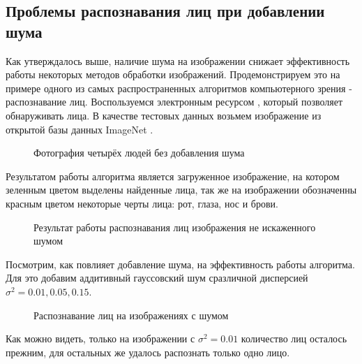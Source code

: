 \subsection{Проблемы распознавания лиц при добавлении шума}
Как утверждалось выше, наличие шума на изображении снижает эффективность работы некоторых методов обработки изображений. Продемонстрируем это на примере одного из самых распространенных алгоритмов компьютерного зрения - распознавание лиц.
Воспользуемся электронным ресурсом \cite{FaceDetections}, который позволяет обнаруживать лица. В качестве тестовых данных возьмем изображение из открытой базы данных ImageNet \cite{imageNet}.
\begin{figure}[H]
	\caption{Фотография четырёх людей без добавления  шума}
\end{figure}
Результатом работы алгоритма является загруженное изображение, на котором зеленным цветом выделены найденные лица, так же на изображении обозначенны красным цветом некоторые черты лица: рот, глаза, нос и брови.
\begin{figure}[H]
	\caption{Результат работы распознавания лиц изображения не искаженного шумом}
\end{figure}
Посмотрим, как повлияет добавление шума, на эффективность работы алгоритма. Для это добавим аддитивный гауссовский шум сразличной дисперсией $\sigma^2=0.01, 0.05, 0.15$. 
\begin{figure}[H]
	\begin{minipage}[H]{0.32\linewidth}
	\end{minipage}
	\begin{minipage}[H]{0.32\linewidth}
	\end{minipage}
	\begin{minipage}[H]{0.32\linewidth}
	\end{minipage}
	\caption{Распознавание лиц на изображениях с шумом}
\end{figure}
Как можно видеть, только на изображении с $\sigma^2=0.01$ количество лиц осталось прежним, для остальных же удалось распознать только одно лицо.

